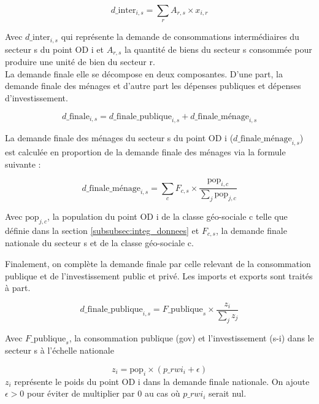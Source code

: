 \documentclass[12pt,a4paper,french]{report}
\begin{document}
	\begin{equation}
		d\_\text{inter}_{i,s} = \sum_r A_{r,s} \times x_{i,r}
		\label{eq:conso_inter}
	\end{equation}
	
	Avec $d\_\text{inter}_{i,s}$ qui représente la demande de consommations intermédiaires du secteur s du point OD i et $A_{r,s}$ la quantité de biens du secteur s consommée pour produire une unité de bien du secteur r. \\ 

	La demande finale elle se décompose en deux composantes. D'une part, la demande finale des ménages et d'autre part les dépenses publiques et dépenses d'investissement. 
	
	\begin{equation}
		d\_\text{finale}_{i,s} = d\_\text{finale\_publique}_{i,s} + d\_\text{finale\_ménage}_{i,s} 
		\label{eq:conso_finale}
	\end{equation}
	\medskip
	
	La demande finale des ménages du secteur s du point OD i ($d\_\text{finale\_ménage}_{i,s}$) est calculée en proportion de la demande finale des ménages via la formule suivante :
	
	\begin{equation}
		d\_\text{finale\_ménage}_{i,s} = \sum_c F_{c,s}\times \frac{\text{pop}_{i,c}}{\sum_j \text{pop}_{j,c}}
		\label{eq:conso_finale_menage}
	\end{equation}
	\medskip
	
	Avec $\text{pop}_{j,c}$, la population du point OD i de la classe géo-sociale c telle que définie dans la section \ref{subsubsec:integ_donnees} et $F_{c,s}$, la demande finale nationale du secteur s et de la classe géo-sociale c.
	\medskip

	
	Finalement, on complète la demande finale par celle relevant de la consommation publique et de l'investissement public et privé. Les imports et exports sont traités à part. 
	
	\begin{equation}
 	d\_\text{finale\_publique}_{i,s} = F\_\text{publique}_s\times \frac{z_i}{\sum_j z_j}
 		\label{eq:conso_finale_publique}
	\end{equation}
	
	Avec $F\_\text{publique}_s$, la consommation publique (gov) et l'investissement (s-i) dans le secteur s à l'échelle nationale 
	
	\begin{equation}
		z_i = \text{pop}_i \times (p\_rwi_i + \epsilon)
	\end{equation} 
	$z_i$ représente le poids du point OD i dans la demande finale nationale. On ajoute $\epsilon>0$ pour éviter de multiplier par 0 au cas où $p\_rwi_i$ serait nul. 
	
\end{document}
